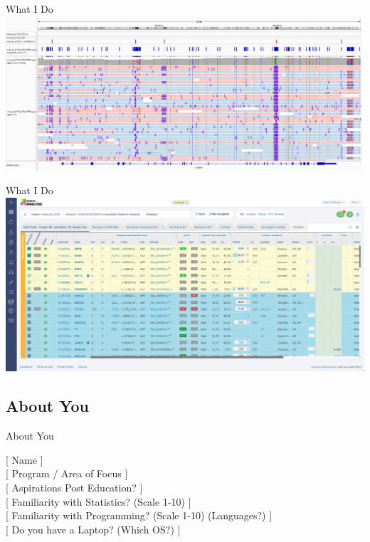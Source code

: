 \documentclass[aspectratio=169,xcolor=dvipsnames]{beamer}
\begin{document}
\begin{frame}{What I Do}
        \includegraphics[scale=0.6]{images/IGV.png}
\end{frame}

\begin{frame}{What I Do}
        \includegraphics[scale=0.22]{images/geneyx.png}
\end{frame}

\subsection{About You}
\begin{frame}{About You}
    \begin{center}
        [ Name ] \\
        {[ Program / Area of Focus ]} \\
        {[ Aspirations Post Education? ]} \\
        {[ Familiarity with Statistics? (Scale 1-10) ]} \\
        {[ Familiarity with Programming? (Scale 1-10) (Languages?) ]} \\
        {[ Do you have a Laptop? (Which OS?) ]}
    \end{center}
\end{frame}
\end{document}
